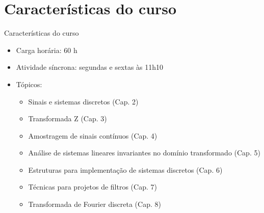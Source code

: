    \section[ slide = true]{Características do curso}
      \begin{slide}[toc=]{Características do curso}
         \begin{itemize}
            \item Carga horária: 60 h
            \item Atividade síncrona: segundas e sextas às 11h10
            \item Tópicos:
            \begin{itemize}
               \item Sinais e sistemas discretos (Cap. 2)
               \item Transformada Z (Cap. 3)
               \item Amostragem de sinais contínuos (Cap. 4)
               \item Análise de sistemas lineares invariantes no domínio transformado (Cap. 5)
               \item Estruturas para implementação de sistemas discretos (Cap. 6)
               \item Técnicas para projetos de filtros (Cap. 7)
               \item Transformada de Fourier discreta (Cap. 8)
            \end{itemize}
         \end{itemize}         
      \end{slide}
      

